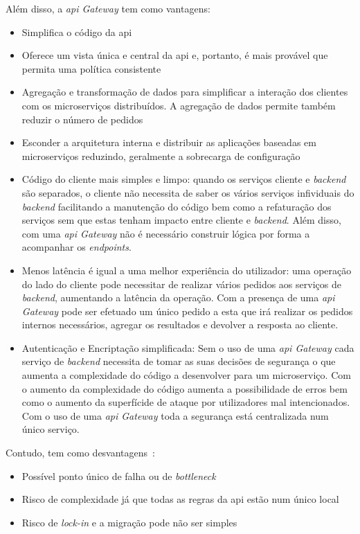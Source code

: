 Além disso, a \textit{\acrshort{api} Gateway} tem como vantagens:~\cite{apiGatInfo, apiGatInfo3}
\begin{itemize}
    \item Simplifica o código da \acrshort{api}
    \item Oferece um vista única e central da \acrshort{api} e, portanto, é mais provável que permita uma política consistente
    \item Agregação e transformação de dados para simplificar a interação dos clientes com os microserviços distribuídos. A agregação de dados permite também reduzir o número de pedidos
    \item Esconder a arquitetura interna e distribuir as aplicações baseadas em microserviços reduzindo, geralmente a sobrecarga de configuração 
    \item Código do cliente mais simples e limpo: quando os serviços cliente e \textit{backend} são separados, o cliente não necessita de saber os vários serviços infividuais do \textit{backend} facilitando a manutenção do código bem como a refaturação dos serviços sem que estas tenham impacto entre cliente e \textit{backend}. Além disso, com uma \textit{\acrshort{api} Gateway} não é necessário construir lógica por forma a acompanhar os \textit{endpoints}.
    \item Menos latência é igual a uma melhor experiência do utilizador: uma operação do lado do cliente pode necessitar de realizar vários pedidos aos serviços de \textit{backend}, aumentando a latência da operação. Com a presença de uma \textit{\acrshort{api} Gateway} pode ser efetuado um único pedido a esta que irá realizar os pedidos internos necessários, agregar os resultados e devolver a resposta ao cliente.
    \item Autenticação e Encriptação simplificada: Sem o uso de uma \textit{\acrshort{api} Gateway} cada serviço de \textit{backend} necessita de tomar as suas decisões de segurança o que aumenta a complexidade do código a desenvolver para um microserviço. Com o aumento da complexidade do código aumenta a possibilidade de erros bem como o aumento da superfícide de ataque por utilizadores mal intencionados. Com o uso de uma \textit{\acrshort{api} Gateway} toda a segurança está centralizada num único serviço.
\end{itemize}

Contudo, tem como desvantagens~\cite{apiGatInfo}:
\begin{itemize}
    \item Possível ponto único de falha ou de \textit{bottleneck}
    \item Risco de complexidade já que todas as regras da \acrshort{api} estão num único local
    \item Risco de \textit{lock-in} e a migração pode não ser simples
\end{itemize}

